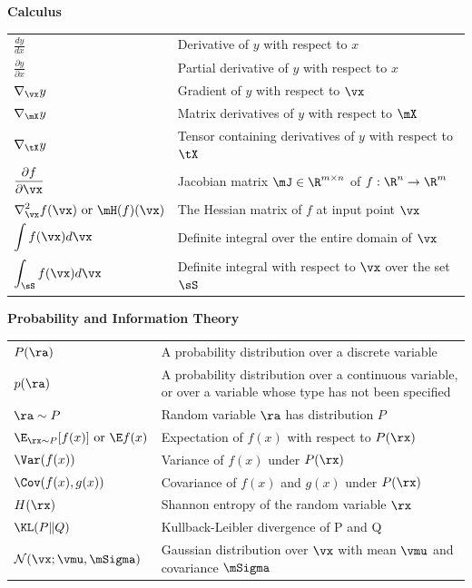 \documentclass{article} %
\begin{document}
\centerline{\bf Calculus}
\bgroup
\def\arraystretch{1.5}
\begin{tabular}{p{1.25in}p{3.25in}}
$\displaystyle\frac{d y} {d x}$ & Derivative of $y$ with respect to $x$\\ [2ex]
$\displaystyle \frac{\partial y} {\partial x} $ & Partial derivative of $y$ with respect to $x$ \\
$\displaystyle \nabla_\vx y $ & Gradient of $y$ with respect to $\vx$ \\
$\displaystyle \nabla_\mX y $ & Matrix derivatives of $y$ with respect to $\mX$ \\
$\displaystyle \nabla_\tX y $ & Tensor containing derivatives of $y$ with respect to $\tX$ \\
$\displaystyle \frac{\partial f}{\partial \vx} $ & Jacobian matrix
$\mJ \in \R^{m\times n}$ of $f: \R^n \rightarrow \R^m$\\
$\displaystyle \nabla_\vx^2 f(\vx)\text{ or }\mH( f)(\vx)$ & The Hessian matrix of $f$ at input point $\vx$\\
$\displaystyle \int f(\vx) d\vx $ & Definite integral over the entire domain of $\vx$ \\
$\displaystyle \int_\sS f(\vx) d\vx$ & Definite integral with respect to $\vx$ over the set $\sS$ \\
\end{tabular}
\egroup
\vspace{0.25cm}

\centerline{\bf Probability and Information Theory}
\bgroup
\def\arraystretch{1.5}
\begin{tabular}{p{1.25in}p{3.25in}}
$\displaystyle P(\ra)$ & A probability distribution over a discrete variable\\
$\displaystyle p(\ra)$ & A probability distribution over a continuous variable, or over
a variable whose type has not been specified\\
$\displaystyle \ra \sim P$ & Random variable $\ra$ has distribution $P$\\
$\displaystyle  \E_{\rx\sim P} [ f(x) ]\text{ or } \E f(x)$ & Expectation of $f(x)$ with respect to $P(\rx)$ \\
$\displaystyle \Var(f(x)) $ &  Variance of $f(x)$ under $P(\rx)$ \\
$\displaystyle \Cov(f(x),g(x)) $ & Covariance of $f(x)$ and $g(x)$ under $P(\rx)$\\
$\displaystyle H(\rx) $ & Shannon entropy of the random variable $\rx$\\
$\displaystyle \KL ( P \Vert Q ) $ & Kullback-Leibler divergence of P and Q \\
$\displaystyle \mathcal{N} ( \vx ; \vmu , \mSigma)$ & Gaussian distribution %
over $\vx$ with mean $\vmu$ and covariance $\mSigma$ \\
\end{tabular}
\egroup
\vspace{0.25cm}
\end{document}
